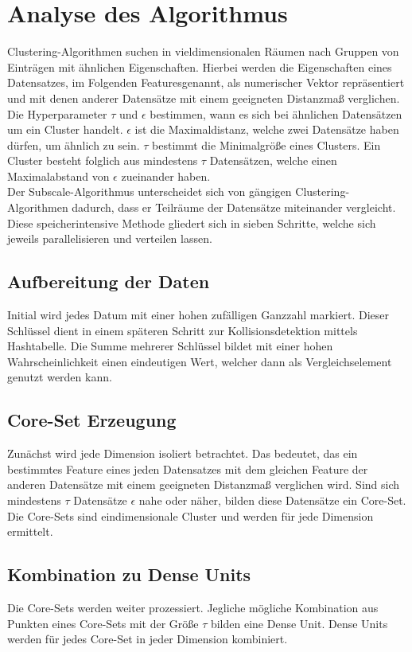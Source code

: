 \section{Analyse des Algorithmus}
Clustering-Algorithmen suchen in vieldimensionalen Räumen nach Gruppen von Einträgen mit ähnlichen Eigenschaften.
Hierbei werden die Eigenschaften eines Datensatzes, im Folgenden \glqq Features\grqq genannt, als numerischer Vektor
repräsentiert und mit denen anderer Datensätze mit einem geeigneten Distanzmaß verglichen. Die Hyperparameter $\tau$
und $\epsilon$ bestimmen, wann es sich bei ähnlichen Datensätzen um ein Cluster handelt. $\epsilon$ ist die
Maximaldistanz, welche zwei Datensätze haben dürfen, um ähnlich zu sein. $\tau$ bestimmt die Minimalgröße eines
Clusters. Ein Cluster besteht folglich aus mindestens $\tau$ Datensätzen, welche einen Maximalabstand von $\epsilon$
zueinander haben.\\
Der Subscale-Algorithmus unterscheidet sich von gängigen Clustering-Algorithmen dadurch, dass er Teilräume der
Datensätze miteinander vergleicht. Diese speicherintensive Methode gliedert sich in sieben Schritte, welche sich jeweils
parallelisieren und verteilen lassen.

\subsection{Aufbereitung der Daten}
Initial wird jedes Datum mit einer hohen zufälligen Ganzzahl markiert. Dieser Schlüssel dient in einem späteren Schritt
zur Kollisionsdetektion mittels Hashtabelle. Die Summe mehrerer Schlüssel bildet mit einer hohen Wahrscheinlichkeit
einen eindeutigen Wert, welcher dann als Vergleichselement genutzt werden kann.

\subsection{Core-Set Erzeugung}
Zunächst wird jede Dimension isoliert betrachtet. Das bedeutet, das ein bestimmtes Feature eines jeden Datensatzes mit
dem gleichen Feature der anderen Datensätze mit einem geeigneten Distanzmaß verglichen wird. Sind sich mindestens $\tau$
Datensätze $\epsilon$ nahe oder näher, bilden diese Datensätze ein Core-Set. Die Core-Sets sind eindimensionale Cluster
und werden für jede Dimension ermittelt.

\subsection{Kombination zu Dense Units}
Die Core-Sets werden weiter prozessiert. Jegliche mögliche Kombination aus Punkten eines Core-Sets mit der Größe $\tau$
bilden eine Dense Unit. Dense Units werden für jedes Core-Set in jeder Dimension kombiniert.

